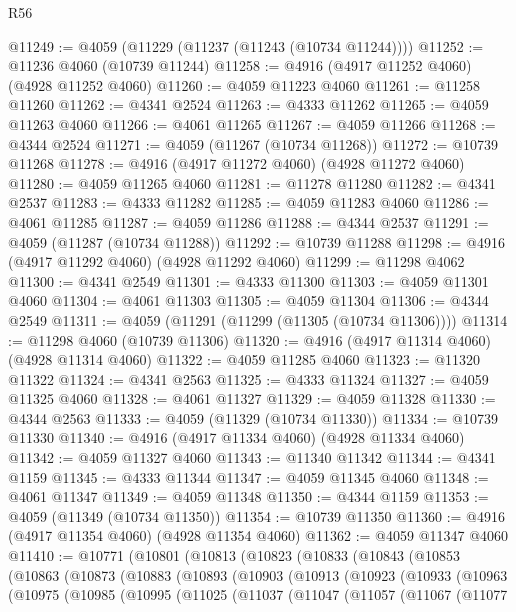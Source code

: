 \begin{lexlean}{R56}
\begin{coremodule}
@11249 := @4059 (@11229 (@11237 (@11243 (@10734 @11244))))
@11252 := @11236 @4060 (@10739 @11244)
@11258 := @4916 (@4917 @11252 @4060) (@4928 @11252 @4060)
@11260 := @4059 @11223 @4060
@11261 := @11258 @11260
@11262 := @4341 @2524
@11263 := @4333 @11262
@11265 := @4059 @11263 @4060
@11266 := @4061 @11265
@11267 := @4059 @11266
@11268 := @4344 @2524
@11271 := @4059 (@11267 (@10734 @11268))
@11272 := @10739 @11268
@11278 := @4916 (@4917 @11272 @4060) (@4928 @11272 @4060)
@11280 := @4059 @11265 @4060
@11281 := @11278 @11280
@11282 := @4341 @2537
@11283 := @4333 @11282
@11285 := @4059 @11283 @4060
@11286 := @4061 @11285
@11287 := @4059 @11286
@11288 := @4344 @2537
@11291 := @4059 (@11287 (@10734 @11288))
@11292 := @10739 @11288
@11298 := @4916 (@4917 @11292 @4060) (@4928 @11292 @4060)
@11299 := @11298 @4062
@11300 := @4341 @2549
@11301 := @4333 @11300
@11303 := @4059 @11301 @4060
@11304 := @4061 @11303
@11305 := @4059 @11304
@11306 := @4344 @2549
@11311 := @4059 (@11291 (@11299 (@11305 (@10734 @11306))))
@11314 := @11298 @4060 (@10739 @11306)
@11320 := @4916 (@4917 @11314 @4060) (@4928 @11314 @4060)
@11322 := @4059 @11285 @4060
@11323 := @11320 @11322
@11324 := @4341 @2563
@11325 := @4333 @11324
@11327 := @4059 @11325 @4060
@11328 := @4061 @11327
@11329 := @4059 @11328
@11330 := @4344 @2563
@11333 := @4059 (@11329 (@10734 @11330))
@11334 := @10739 @11330
@11340 := @4916 (@4917 @11334 @4060) (@4928 @11334 @4060)
@11342 := @4059 @11327 @4060
@11343 := @11340 @11342
@11344 := @4341 @1159
@11345 := @4333 @11344
@11347 := @4059 @11345 @4060
@11348 := @4061 @11347
@11349 := @4059 @11348
@11350 := @4344 @1159
@11353 := @4059 (@11349 (@10734 @11350))
@11354 := @10739 @11350
@11360 := @4916 (@4917 @11354 @4060) (@4928 @11354 @4060)
@11362 := @4059 @11347 @4060
@11410 := @10771
    (@10801
      (@10813
        (@10823
          (@10833
            (@10843
              (@10853
                (@10863
                  (@10873
                    (@10883
                      (@10893
                        (@10903
                          (@10913
                            (@10923
                              (@10933
                                (@10963
                                  (@10975
                                    (@10985
                                      (@10995
                                        (@11025
                                          (@11037
                                            (@11047
                                              (@11057
                                                (@11067
                                                  (@11077

\end{coremodule}
\end{lexlean}
